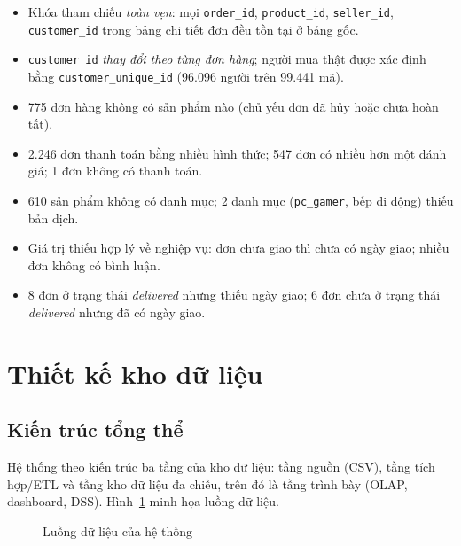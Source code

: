 \documentclass[12pt,a4paper]{article}
\newcommand{\code}[1]{\texttt{\small #1}}
\begin{document}
\begin{itemize}[nosep]
  \item Khóa tham chiếu \emph{toàn vẹn}: mọi \code{order\_id}, \code{product\_id}, \code{seller\_id},
        \code{customer\_id} trong bảng chi tiết đơn đều tồn tại ở bảng gốc.
  \item \code{customer\_id} \emph{thay đổi theo từng đơn hàng}; người mua thật được xác định bằng
        \code{customer\_unique\_id} (96.096 người trên 99.441 mã).
  \item 775 đơn hàng không có sản phẩm nào (chủ yếu đơn đã hủy hoặc chưa hoàn tất).
  \item 2.246 đơn thanh toán bằng nhiều hình thức; 547 đơn có nhiều hơn một đánh giá; 1 đơn không có thanh toán.
  \item 610 sản phẩm không có danh mục; 2 danh mục (\code{pc\_gamer}, bếp di động) thiếu bản dịch.
  \item Giá trị thiếu hợp lý về nghiệp vụ: đơn chưa giao thì chưa có ngày giao; nhiều đơn không có bình luận.
  \item 8 đơn ở trạng thái \emph{delivered} nhưng thiếu ngày giao; 6 đơn chưa ở trạng thái \emph{delivered} nhưng đã có ngày giao.
\end{itemize}

\section{Thiết kế kho dữ liệu}

\subsection{Kiến trúc tổng thể}
Hệ thống theo kiến trúc ba tầng của kho dữ liệu: tầng nguồn (CSV), tầng tích hợp/ETL và tầng kho dữ liệu đa chiều,
trên đó là tầng trình bày (OLAP, dashboard, DSS). Hình~\ref{fig:arch} minh họa luồng dữ liệu.

\begin{figure}[h]
\centering
{}
\caption{Luồng dữ liệu của hệ thống}\label{fig:arch}
\end{figure}
\end{document}
